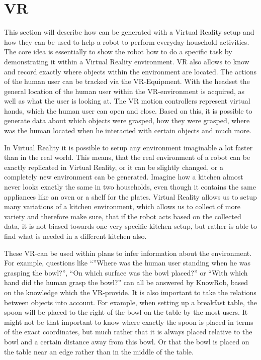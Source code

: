 \section{VR \neems}
\label{sec:vr-neem}
\lstset{style=lispcode}

This section will describe how \neems can be generated with a Virtual Reality setup and how they can be used to help a robot to perform everyday household activities. The core idea is essentially to show the robot how to do a specific task by demonstrating it within a Virtual Reality environment. VR also allows to know and record exactly where objects within the environment are located. The actions of the human user can be tracked via the VR-Equipment.  With the headset the general location of the human user within the VR-environment is acquired, as well as what the user is looking at. The VR motion controllers represent virtual hands, which the human user can open and close. Based on this, it is possible to generate data about which objects were grasped, how they were grasped, where was the human located when he interacted with certain objects and much more. 

In Virtual Reality it is possible to setup any environment imaginable a lot faster than in the real world. This means, that the real environment of a robot can be exactly replicated in Virtual Reality, or it can be slightly changed, or a completely new environment can be generated. Imagine how a kitchen almost never looks exactly the same in two households, even though it contains the same appliances like an oven or a shelf for the plates.  Virtual Reality allows us to setup many variations of a kitchen environment, which allows us to collect \neems of more variety and therefore make sure, that if the robot acts based on the collected data, it is not biased towards one very specific kitchen setup, but rather is able to find what is needed in a different kitchen also. 

These VR-\neems can be used within \cram plans to infer information about the environment. For example, questions like ``''Where was the human user standing when he was grasping the bowl?'', ``On which surface was the bowl placed?'' or ``With which hand did the human grasp the bowl?'' can all be answered by KnowRob, based on the knowledge which the VR-\neems provide. It is also important to take the relations between objects into account. For example, when setting up a breakfast table, the spoon will be placed to the right of the bowl on the table by the most users. It might not be that important to know where exactly the spoon is placed in terms of the exact coordinates, but much rather that it is always placed relative to the bowl and a certain distance away from this bowl. Or that the bowl is placed on the table near an edge rather than in the middle of the table. 

